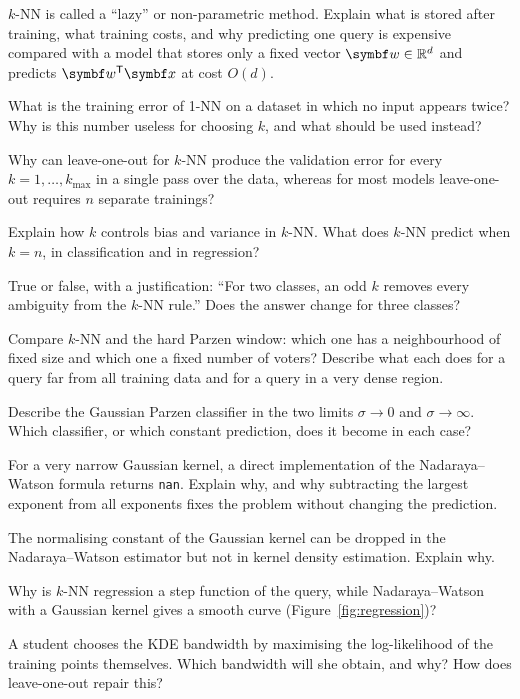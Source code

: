 \documentclass[11pt]{article}
\begin{document}
\begin{questions}
\begin{conceptual}
\item $k$-NN is called a ``lazy'' or non-parametric method. Explain what is stored after training, what training
costs, and why predicting one query is expensive compared with a model that stores only a fixed vector
$\vect{w} \in \R^d$ and predicts $\vect{w}\T\x$ at cost $O(d)$.
\item What is the training error of 1-NN on a dataset in which no input appears twice? Why is this number useless
for choosing $k$, and what should be used instead?
\item Why can leave-one-out for $k$-NN produce the validation error for every $k = 1, \dots, k_{\max}$ in a single pass over
the data, whereas for most models leave-one-out requires $n$ separate trainings?
\item Explain how $k$ controls bias and variance in $k$-NN. What does $k$-NN predict when $k = n$, in classification
and in regression?
\item True or false, with a justification: ``For two classes, an odd $k$ removes every ambiguity from the $k$-NN
rule.'' Does the answer change for three classes?
\item Compare $k$-NN and the hard Parzen window: which one has a neighbourhood of fixed size and which one a fixed
number of voters? Describe what each does for a query far from all training data and for a query in a very dense
region.
\item Describe the Gaussian Parzen classifier in the two limits $\sigma \to 0$ and $\sigma \to \infty$. Which
classifier, or which constant prediction, does it become in each case?
\item For a very narrow Gaussian kernel, a direct implementation of the Nadaraya--Watson formula returns
\texttt{nan}. Explain why, and why subtracting the largest exponent from all exponents fixes the problem without
changing the prediction.
\item The normalising constant of the Gaussian kernel can be dropped in the Nadaraya--Watson estimator but not in
kernel density estimation. Explain why.
\item Why is $k$-NN regression a step function of the query, while Nadaraya--Watson with a Gaussian kernel gives a
smooth curve (Figure~\ref{fig:regression})?
\item A student chooses the KDE bandwidth by maximising the log-likelihood of the training points themselves. Which
bandwidth will she obtain, and why? How does leave-one-out repair this?

\end{conceptual}
\end{questions}
\end{document}
